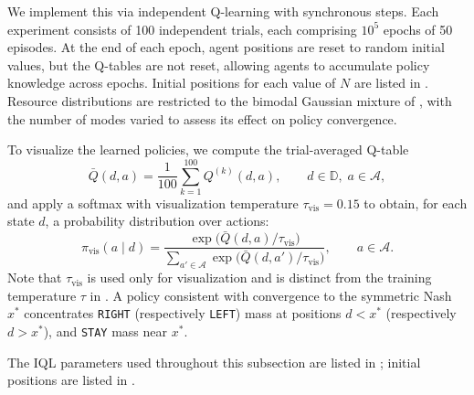 \documentclass{article}
\begin{document}
            We implement this via independent Q-learning with synchronous steps. Each experiment consists of 100 independent trials, each comprising $10^5$ epochs of 50 episodes. At the end of each epoch, agent positions are reset to random initial values, but the Q-tables are not reset, allowing agents to accumulate policy knowledge across epochs. Initial positions for each value of $N$ are listed in . Resource distributions are restricted to the bimodal Gaussian mixture of , with the number of modes varied to assess its effect on policy convergence.

            To visualize the learned policies, we compute the trial-averaged Q-table
            \begin{equation}\label{eq:SI_avg_Q}
                \bar{Q}(d,a) = \frac{1}{100}\sum_{k=1}^{100} Q^{(k)}(d,a), \qquad d \in \mathbb{D},\; a \in \mathcal{A},
            \end{equation}
            and apply a softmax with visualization temperature $\tau_{\mathrm{vis}} = 0.15$ to obtain, for each state $d$, a probability distribution over actions:
            \begin{equation}\label{eq:SI_softmax_policy}
                \pi_{\mathrm{vis}}(a \mid d) = \frac{\exp\!\bigl(\bar{Q}(d,a)/\tau_{\mathrm{vis}}\bigr)}{\sum_{a'\in\mathcal{A}}\exp\!\bigl(\bar{Q}(d,a')/\tau_{\mathrm{vis}}\bigr)}, \qquad a \in \mathcal{A}.
            \end{equation}
            Note that $\tau_{\mathrm{vis}}$ is used only for visualization and is distinct from the training temperature $\tau$ in . A policy consistent with convergence to the symmetric Nash $x^*$ concentrates \texttt{RIGHT} (respectively \texttt{LEFT}) mass at positions $d < x^*$ (respectively $d > x^*$), and \texttt{STAY} mass near $x^*$.

            The IQL parameters used throughout this subsection are listed in ; initial positions are listed in .
\end{document}
